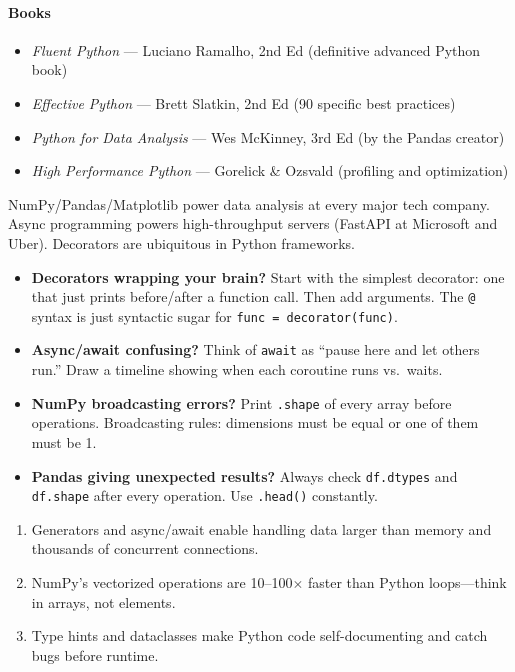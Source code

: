 \documentclass[11pt, a4paper, oneside]{report}
\begin{document}
\paragraph{Books}
\begin{itemize}[leftmargin=*]
\item \emph{Fluent Python} --- Luciano Ramalho, 2nd Ed (definitive advanced Python book)
\item \emph{Effective Python} --- Brett Slatkin, 2nd Ed (90 specific best practices)
\item \emph{Python for Data Analysis} --- Wes McKinney, 3rd Ed (by the Pandas creator)
\item \emph{High Performance Python} --- Gorelick \& Ozsvald (profiling and optimization)
\end{itemize}


\begin{realworldbox}
NumPy/Pandas/Matplotlib power data analysis at every major tech company. Async programming powers high-throughput servers (FastAPI at Microsoft and Uber). Decorators are ubiquitous in Python frameworks.
\end{realworldbox}


\begin{stuckbox}
\begin{itemize}[leftmargin=*]
\item \textbf{Decorators wrapping your brain?} Start with the simplest decorator: one that just prints before/after a function call. Then add arguments. The \texttt{@} syntax is just syntactic sugar for \texttt{func = decorator(func)}.
\item \textbf{Async/await confusing?} Think of \texttt{await} as ``pause here and let others run.'' Draw a timeline showing when each coroutine runs vs.\ waits.
\item \textbf{NumPy broadcasting errors?} Print \texttt{.shape} of every array before operations. Broadcasting rules: dimensions must be equal or one of them must be 1.
\item \textbf{Pandas giving unexpected results?} Always check \texttt{df.dtypes} and \texttt{df.shape} after every operation. Use \texttt{.head()} constantly.
\end{itemize}
\end{stuckbox}


\begin{takeawaybox}
\begin{enumerate}[leftmargin=*]
\item Generators and async/await enable handling data larger than memory and thousands of concurrent connections.
\item NumPy's vectorized operations are 10--100$\times$ faster than Python loops---think in arrays, not elements.
\item Type hints and dataclasses make Python code self-documenting and catch bugs before runtime.
\end{enumerate}
\end{takeawaybox}
\end{document}
